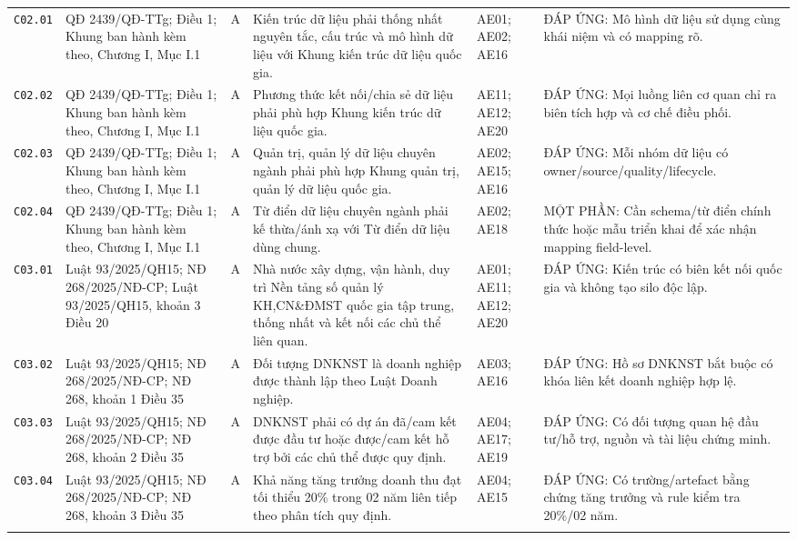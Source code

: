 \begin{longtable}{@{}p{0.9cm}p{3.0cm}p{0.55cm}p{4.05cm}p{2.0cm}p{3.45cm}@{}}
\texttt{C02.01} & QĐ 2439/QĐ-TTg; Điều 1; Khung ban hành kèm theo, Chương I, Mục I.1 & A & Kiến trúc dữ liệu phải thống nhất nguyên tắc, cấu trúc và mô hình dữ liệu với Khung kiến trúc dữ liệu quốc gia. & AE01; AE02; AE16 & ĐÁP ỨNG: Mô hình dữ liệu sử dụng cùng khái niệm và có mapping rõ. \\ \addlinespace[1pt]
\texttt{C02.02} & QĐ 2439/QĐ-TTg; Điều 1; Khung ban hành kèm theo, Chương I, Mục I.1 & A & Phương thức kết nối/chia sẻ dữ liệu phải phù hợp Khung kiến trúc dữ liệu quốc gia. & AE11; AE12; AE20 & ĐÁP ỨNG: Mọi luồng liên cơ quan chỉ ra biên tích hợp và cơ chế điều phối. \\ \addlinespace[1pt]
\texttt{C02.03} & QĐ 2439/QĐ-TTg; Điều 1; Khung ban hành kèm theo, Chương I, Mục I.1 & A & Quản trị, quản lý dữ liệu chuyên ngành phải phù hợp Khung quản trị, quản lý dữ liệu quốc gia. & AE02; AE15; AE16 & ĐÁP ỨNG: Mỗi nhóm dữ liệu có owner/source/quality/lifecycle. \\ \addlinespace[1pt]
\texttt{C02.04} & QĐ 2439/QĐ-TTg; Điều 1; Khung ban hành kèm theo, Chương I, Mục I.1 & A & Từ điển dữ liệu chuyên ngành phải kế thừa/ánh xạ với Từ điển dữ liệu dùng chung. & AE02; AE18 & MỘT PHẦN: Cần schema/từ điển chính thức hoặc mẫu triển khai để xác nhận mapping field-level. \\ \addlinespace[1pt]
\texttt{C03.01} & Luật 93/2025/QH15; NĐ 268/2025/NĐ-CP; Luật 93/2025/QH15, khoản 3 Điều 20 & A & Nhà nước xây dựng, vận hành, duy trì Nền tảng số quản lý KH,CN\&ĐMST quốc gia tập trung, thống nhất và kết nối các chủ thể liên quan. & AE01; AE11; AE12; AE20 & ĐÁP ỨNG: Kiến trúc có biên kết nối quốc gia và không tạo silo độc lập. \\ \addlinespace[1pt]
\texttt{C03.02} & Luật 93/2025/QH15; NĐ 268/2025/NĐ-CP; NĐ 268, khoản 1 Điều 35 & A & Đối tượng DNKNST là doanh nghiệp được thành lập theo Luật Doanh nghiệp. & AE03; AE16 & ĐÁP ỨNG: Hồ sơ DNKNST bắt buộc có khóa liên kết doanh nghiệp hợp lệ. \\ \addlinespace[1pt]
\texttt{C03.03} & Luật 93/2025/QH15; NĐ 268/2025/NĐ-CP; NĐ 268, khoản 2 Điều 35 & A & DNKNST phải có dự án đã/cam kết được đầu tư hoặc được/cam kết hỗ trợ bởi các chủ thể được quy định. & AE04; AE17; AE19 & ĐÁP ỨNG: Có đối tượng quan hệ đầu tư/hỗ trợ, nguồn và tài liệu chứng minh. \\ \addlinespace[1pt]
\texttt{C03.04} & Luật 93/2025/QH15; NĐ 268/2025/NĐ-CP; NĐ 268, khoản 3 Điều 35 & A & Khả năng tăng trưởng doanh thu đạt tối thiểu 20\% trong 02 năm liên tiếp theo phân tích quy định. & AE04; AE15 & ĐÁP ỨNG: Có trường/artefact bằng chứng tăng trưởng và rule kiểm tra 20\%/02 năm. \\ \addlinespace[1pt]

\end{longtable}
